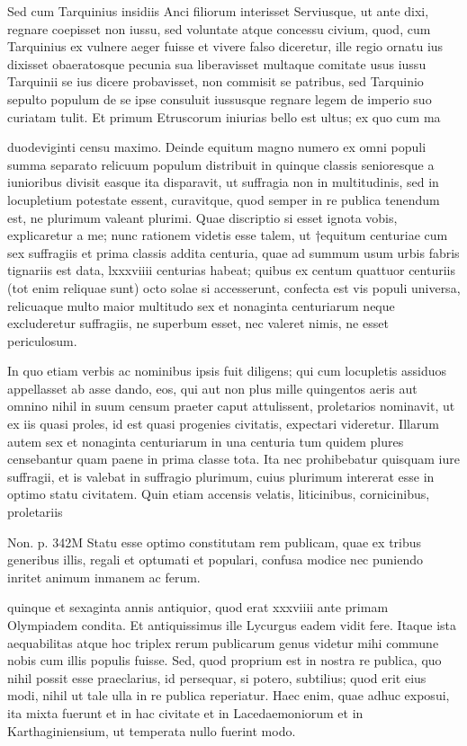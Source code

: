  Sed cum Tarquinius insidiis Anci filiorum interisset Serviusque, ut ante dixi, regnare coepisset non iussu, sed voluntate atque concessu civium, quod, cum Tarquinius ex vulnere aeger fuisse et vivere falso diceretur, ille regio ornatu ius dixisset obaeratosque pecunia sua liberavisset multaque comitate usus iussu Tarquinii se ius dicere probavisset, non commisit se patribus, sed Tarquinio sepulto populum de se ipse consuluit iussusque regnare legem de imperio suo curiatam tulit. Et primum Etruscorum iniurias bello est ultus; ex quo cum ma

 duodeviginti censu maximo. Deinde equitum magno numero ex omni populi summa separato relicuum populum distribuit in quinque classis senioresque a iunioribus divisit easque ita disparavit, ut suffragia non in multitudinis, sed in locupletium potestate essent, curavitque, quod semper in re publica tenendum est, ne plurimum valeant plurimi. Quae discriptio si esset ignota vobis, explicaretur a me; nunc rationem videtis esse talem, ut †equitum centuriae cum sex suffragiis et prima classis addita centuria, quae ad summum usum urbis fabris tignariis est data, lxxxviiii centurias habeat; quibus ex centum quattuor centuriis (tot enim reliquae sunt) octo solae si accesserunt, confecta est vis populi universa, relicuaque multo maior multitudo sex et nonaginta centuriarum neque excluderetur suffragiis, ne superbum esset, nec valeret nimis, ne esset periculosum.

 In quo etiam verbis ac nominibus ipsis fuit diligens; qui cum locupletis assiduos appellasset ab asse dando, eos, qui aut non plus mille quingentos aeris aut omnino nihil in suum censum praeter caput attulissent, proletarios nominavit, ut ex iis quasi proles, id est quasi progenies civitatis, expectari videretur. Illarum autem sex et nonaginta centuriarum in una centuria tum quidem plures censebantur quam paene in prima classe tota. Ita nec prohibebatur quisquam iure suffragii, et is valebat in suffragio plurimum, cuius plurimum intererat esse in optimo statu civitatem. Quin etiam accensis velatis, liticinibus, cornicinibus, proletariis

 Non. p. 342M Statu esse optimo constitutam rem publicam, quae ex tribus generibus illis, regali et optumati et populari, confusa modice nec puniendo inritet animum inmanem ac ferum.

 quinque et sexaginta annis antiquior, quod erat xxxviiii ante primam Olympiadem condita. Et antiquissimus ille Lycurgus eadem vidit fere. Itaque ista aequabilitas atque hoc triplex rerum publicarum genus videtur mihi commune nobis cum illis populis fuisse. Sed, quod proprium est in nostra re publica, quo nihil possit esse praeclarius, id persequar, si potero, subtilius; quod erit eius modi, nihil ut tale ulla in re publica reperiatur. Haec enim, quae adhuc exposui, ita mixta fuerunt et in hac civitate et in Lacedaemoniorum et in Karthaginiensium, ut temperata nullo fuerint modo.

